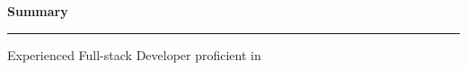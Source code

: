 \documentclass{article}
\newcommand{\sectiontitle}[1]{\vspace{0.15in}\textbf{\Large #1}\vspace{0.05in}\par\rule{\linewidth}{0.4pt}\vspace{0.1in}}
\begin{document}


\sectiontitle{Summary}
Experienced Full-stack Developer proficient in
\end{document}
